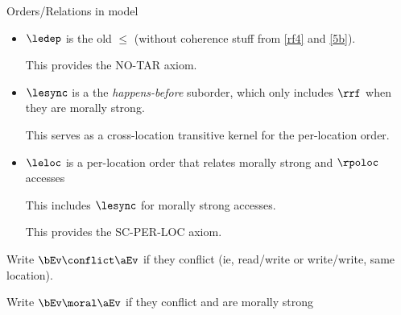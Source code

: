 Orders/Relations in model
\begin{itemize}
\item $\ledep$ is the old $\le$ (without coherence stuff from \ref{rf4} and \ref{5b}).

  This provides the NO-TAR axiom.
\item $\lesync$ is a the \emph{happens-before} suborder, which only includes $\rrf$ when they are morally strong.

  This serves as a cross-location transitive kernel for the per-location order.
  
\item $\leloc$ is a per-location order that relates morally strong  and $\rpoloc$ accesses

  This includes $\lesync$ for  morally strong accesses.

  This provides the SC-PER-LOC axiom.

\end{itemize}

Write $\bEv\conflict\aEv$ if they conflict (ie, read/write or write/write, same location).

Write $\bEv\moral\aEv$ if they conflict and are morally strong

